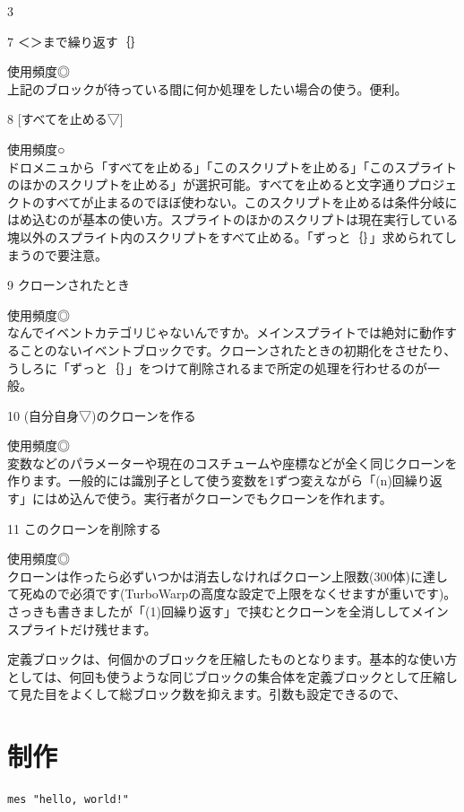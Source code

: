 \documentclass[b5paper,10pt]{jsarticle}
\begin{document}
\begin{multicols*}{3}
\begin{itembox}{7}
＜＞まで繰り返す｛｝
\end{itembox}
使用頻度◎\\
上記のブロックが待っている間に何か処理をしたい場合の使う。便利。
\begin{itembox}{8}
[すべてを止める▽]
\end{itembox}
使用頻度○\\
ドロメニュから「すべてを止める」「このスクリプトを止める」「このスプライトのほかのスクリプトを止める」が選択可能。すべてを止めると文字通りプロジェクトのすべてが止まるのでほぼ使わない。このスクリプトを止めるは条件分岐にはめ込むのが基本の使い方。スプライトのほかのスクリプトは現在実行している塊以外のスプライト内のスクリプトをすべて止める。「ずっと｛｝」求められてしまうので要注意。
\begin{itembox}{9}
クローンされたとき
\end{itembox}
使用頻度◎\\
なんでイベントカテゴリじゃないんですか。メインスプライトでは絶対に動作することのないイベントブロックです。クローンされたときの初期化をさせたり、うしろに「ずっと｛｝」をつけて削除されるまで所定の処理を行わせるのが一般。
\begin{itembox}{10}
(自分自身▽)のクローンを作る
\end{itembox}
使用頻度◎\\
変数などのパラメーターや現在のコスチュームや座標などが全く同じクローンを作ります。一般的には識別子として使う変数を1ずつ変えながら「(n)回繰り返す」にはめ込んで使う。実行者がクローンでもクローンを作れます。
\begin{itembox}{11}
このクローンを削除する
\end{itembox}
使用頻度◎\\
クローンは作ったら必ずいつかは消去しなければクローン上限数(300体)に達して死ぬので必須です(TurboWarpの高度な設定で上限をなくせますが重いです)。さっきも書きましたが「(1)回繰り返す」で挟むとクローンを全消ししてメインスプライトだけ残せます。


定義ブロックは、何個かのブロックを圧縮したものとなります。基本的な使い方としては、何回も使うような同じブロックの集合体を定義ブロックとして圧縮して見た目をよくして総ブロック数を抑えます。引数も設定できるので、


\section{制作}
\begin{lstlisting}[caption=Sample]
mes "hello, world!"
\end{lstlisting}

\end{multicols*}
\end{document}
